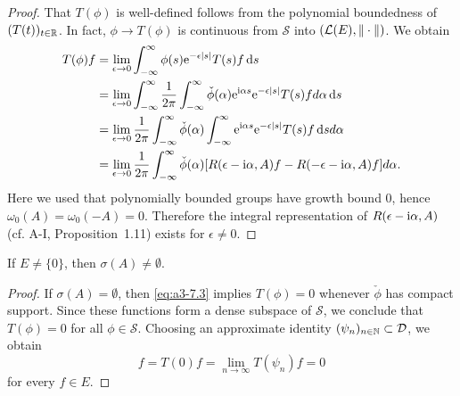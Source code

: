 \begin{proof}
That $T(\phi)$ is well-defined follows from the polynomial boundedness of $(T(t))_{t\in\mathbb{R}}$.
In fact, $\phi \to T(\phi)$ is continuous from $\mathcal{S}$ into $(\mathcal{L}(E),\|\cdot\|)$.
We obtain
\begin{align*}
	T(\phi)f &= \lim_{\epsilon\to 0} \int_{-\infty}^{\infty} \phi(s)\mathrm{e}^{-\epsilon|s|}T(s)f \mathop{}\!\mathrm{d}{s} \\
	&= \lim_{\epsilon\to 0} \int_{-\infty}^{\infty} \frac{1}{2\pi}\int_{-\infty}^{\infty} \check{\phi}(\alpha)\mathrm{e}^{\mathrm{i}\alpha s}\mathrm{e}^{-\epsilon|s|}T(s)f d\alpha \mathop{}\!\mathrm{d}{s} \\
	&= \lim_{\epsilon\to 0} \frac{1}{2\pi}\int_{-\infty}^{\infty} \check{\phi}(\alpha)\int_{-\infty}^{\infty} \mathrm{e}^{\mathrm{i}\alpha s}\mathrm{e}^{-\epsilon|s|}T(s)f \mathop{}\!\mathrm{d}{s} d\alpha \\
	&= \lim_{\epsilon\to 0} \frac{1}{2\pi}\int_{-\infty}^{\infty} \check{\phi}(\alpha)[R(\epsilon-\mathrm{i}\alpha,A)f - R(-\epsilon-\mathrm{i}\alpha,A)f] d\alpha  .
\end{align*}
Here we used that polynomially bounded groups have growth bound $0$, hence $\omega_{0}(A) = \omega_{0}(-A) = 0$.
Therefore the integral representation of $R(\epsilon-\mathrm{i}\alpha,A)$ (cf. A-I, Proposition~1.11) exists for $\epsilon \neq 0$.
\end{proof}
\begin{lemma}\label{lem:a3-7.6}
If $E \neq \{0\}$, then $\sigma(A) \neq \emptyset$.
\end{lemma}
\begin{proof}
If $\sigma(A) = \emptyset$, then \eqref{eq:a3-7.3} implies $T(\phi) = 0$ whenever $\check{\phi}$ has compact support.
Since these functions form a dense subspace of $\mathcal{S}$, we conclude that $T(\phi) = 0$ for all $\phi \in \mathcal{S}$.
Choosing an approximate identity $(\psi_{n})_{n\in\mathbb{N}} \subset \mathcal{D}$, we obtain
\[
f = T(0)f = \lim_{n\to\infty} T(\psi_{n})f = 0
\]
for every $f \in E$.
\end{proof}
